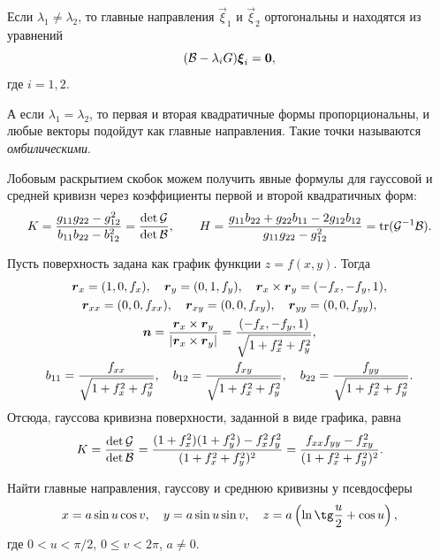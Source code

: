 Если $\lambda_1 \ne \lambda_2$, то главные направления $\vec{\xi}_1$ и $\vec{\xi}_2$ ортогональны и находятся из уравнений
\[
	(\mathcal{B} - \lambda_iG)\boldsymbol{\xi}_i = \boldsymbol{0},
\]
где $i = 1, 2$.

А если $\lambda_1 = \lambda_2$, то первая и вторая квадратичные формы пропорциональны, и любые векторы подойдут как главные направления. Такие точки называются \textit{омбилическими}.

Лобовым раскрытием скобок можем получить явные формулы для гауссовой и средней кривизн через коэффициенты первой и второй квадратичных форм:
\[
	K = \frac{g_{11}g_{22} - g_{12}^2}{b_{11}b_{22} - b_{12}^2} = \frac{\det\mathcal{G}}{\det\mathcal{B}},\qquad H = \frac{g_{11}b_{22} + g_{22}b_{11} - 2g_{12}b_{12}}{g_{11}g_{22} - g_{12}^2} = \operatorname{tr}(\mathcal{G}^{-1}\mathcal{B}).
\]

\begin{example} \label{example:KonPlotSurface}
	Пусть поверхность задана как график функции $z = f(x, y)$. Тогда
	\begin{gather*}
		\boldsymbol{r}_x = (1, 0, f_x),\quad \boldsymbol{r}_{y} = (0, 1, f_y),\quad \boldsymbol{r}_x \times \boldsymbol{r}_y = (-f_x, -f_y, 1),\\
		\boldsymbol{r}_{xx} = (0, 0, f_{xx}),\quad \boldsymbol{r}_{xy} = (0, 0, f_{xy}),\quad \boldsymbol{r}_{yy} = (0, 0, f_{yy}),\\
		\boldsymbol{n} = \frac{\boldsymbol{r}_x \times \boldsymbol{r}_y}{\left\lvert\boldsymbol{r}_x \times \boldsymbol{r}_y\right\rvert} = \frac{(-f_x, -f_y, 1)}{\sqrt{1 + f_x^2 + f_y^2}},\\
		b_{11} = \frac{f_{xx}}{\sqrt{1 + f_x^2 + f_y^2}},\quad b_{12} = \frac{f_{xy}}{\sqrt{1 + f_x^2 + f_y^2}},\quad b_{22} = \frac{f_{yy}}{\sqrt{1 + f_x^2 + f_y^2}}.
	\end{gather*}
	Отсюда, гауссова кривизна поверхности, заданной в виде графика, равна
	\[
		K = \frac{\det\mathcal{G}}{\det\mathcal{B}} = \frac{(1 + f_x^2)(1 + f_y^2) - f_x^2f_y^2}{(1 + f_x^2 + f_y^2)^2} = \frac{f_{xx}f_{yy} - f_{xy}^2}{(1 + f_x^2 + f_y^2)^2}.
	\]
\end{example}

\begin{problem}
	Найти главные направления, гауссову и среднюю кривизны у псевдосферы
	\[
		x = a\sin u\cos v,\quad y = a\sin u\sin v,\quad z = a\br{\ln\tg\frac{u}{2} + \cos u},
	\]
	где $0 < u < \pi / 2$, $0 \leqslant v < 2\pi$, $a \ne 0$.
\end{problem}

